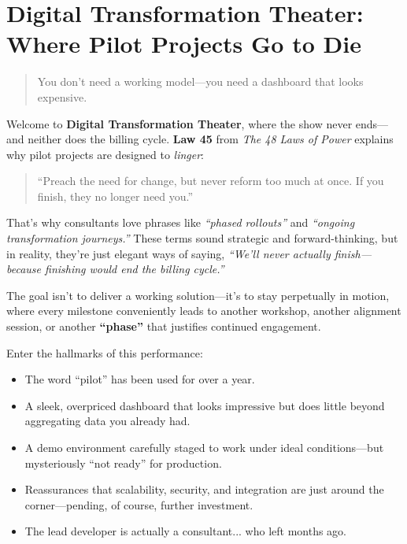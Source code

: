 \section{Digital Transformation Theater: Where Pilot Projects Go to Die}

\begin{quote}
You don’t need a working model—you need a dashboard that looks expensive.
\end{quote}

  Welcome to \textbf{Digital Transformation Theater}, where the show never ends—and neither does the billing cycle.  \textbf{Law 45} from \textit{The 48 Laws of Power} explains why pilot projects are designed to \textit{linger}:

  \begin{quote}
  ``Preach the need for change, but never reform too much at once. If you finish, they no longer need you.''
  \end{quote}
  
  That’s why consultants love phrases like \textit{``phased rollouts''} and \textit{``ongoing transformation journeys.''} These terms sound strategic and forward-thinking, but in reality, they’re just elegant ways of saying, \textit{``We’ll never actually finish—because finishing would end the billing cycle.''}
  
  The goal isn’t to deliver a working solution—it’s to stay perpetually in motion, where every milestone conveniently leads to another workshop, another alignment session, or another \textbf{``phase''} that justifies continued engagement.
  
  Enter the hallmarks of this performance:

  \begin{itemize}
    \item The word “pilot” has been used for over a year.
    \item A sleek, overpriced dashboard that looks impressive but does little beyond aggregating data you already had.
    \item A demo environment carefully staged to work under ideal conditions—but mysteriously ``not ready'' for production.
    \item Reassurances that scalability, security, and integration are just around the corner—pending, of course, further investment.
    \item The lead developer is actually a consultant... who left months ago.
  \end{itemize}
  
